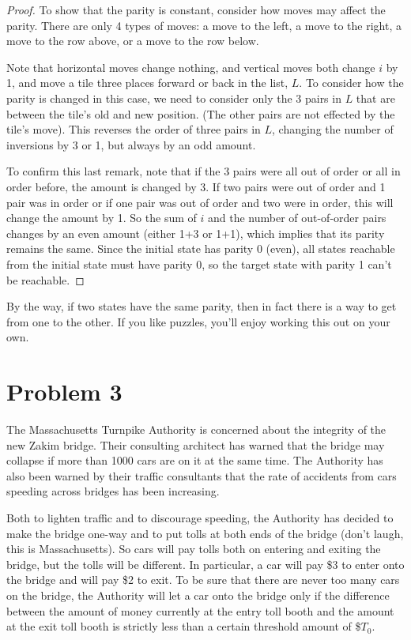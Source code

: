 \documentclass[14pt]{extarticle}
\begin{document}
\begin{proof}
To show that the parity is constant, consider how moves may affect the parity. There are only 4 types of moves: a move to the left, a move to the right, a move to the row above, or a move to the row below.

Note that horizontal moves change nothing, and vertical moves both change $i$ by 1, and move a tile three places forward or back in the list, $L$. To consider how the parity is changed in this case, we need to consider only the 3 pairs in $L$ that are between the tile’s old and new position. (The other pairs are not effected by the tile’s move). This reverses the order of three pairs in $L$, changing the number of inversions by 3 or 1, but always by an odd amount.

To confirm this last remark, note that if the 3 pairs were all out of order or all in order before, the amount is changed by 3. If two pairs were out of order and 1 pair was in order or if one pair was
out of order and two were in order, this will change the amount by 1. So the sum of $i$ and the number of out-of-order pairs changes by an even amount (either 1+3 or 1+1), which implies that its parity remains the same. Since the initial state has parity 0 (even), all states reachable from the initial state must have parity 0, so the target state with parity 1 can’t be reachable.
\end{proof}

By the way, if two states have the same parity, then in fact there is a way to get from one to the other. If you like puzzles, you’ll enjoy working this out on your own.

\section{Problem 3}
The Massachusetts Turnpike Authority is concerned about the integrity of the new Zakim bridge. Their consulting architect has warned that the bridge may collapse if more than 1000 cars are on it at the same time. The Authority has also been warned by their traffic consultants that the rate of accidents from cars speeding across bridges has been increasing.

Both to lighten traffic and to discourage speeding, the Authority has decided to make the bridge one-way and to put tolls at both ends of the bridge (don’t laugh, this is Massachusetts). So cars will pay tolls both on entering and exiting the bridge, but the tolls will be different. In particular, a car will pay \$3 to enter onto the bridge and will pay \$2 to exit. To be sure that there are never too many cars on the bridge, the Authority will let a car onto the bridge only if the difference between the amount of money currently at the entry toll booth and the amount at the exit toll booth is strictly less than a certain threshold amount of \$$T_0$.
\end{document}
